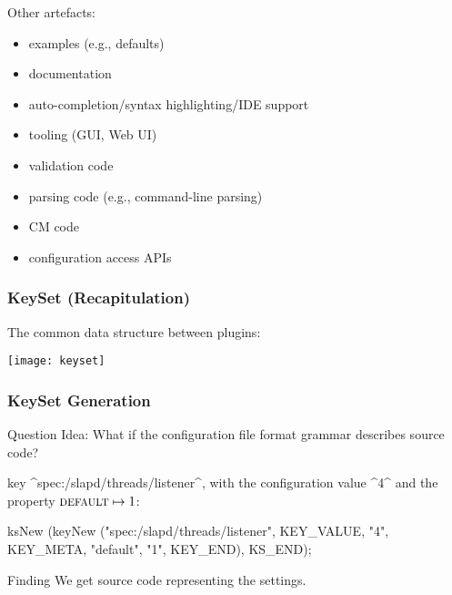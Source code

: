 \begin{frame}
	Other artefacts:

	\pause

	\begin{itemize}
	\item examples (e.g., defaults)
	\item documentation
	\item auto-completion/syntax highlighting/IDE support
	\item tooling (GUI, Web UI)
	\item validation code
	\item parsing code (e.g., command-line parsing)
	\item CM code
	\item configuration access APIs
	\end{itemize}
\end{frame}

\begin{frame}
	\frametitle{KeySet (Recapitulation)}

	The common data structure between plugins:
	\vspace{1cm}

	\texttt{[image: keyset]}
\end{frame}

\begin{frame}[fragile]
	\frametitle{KeySet Generation}
	\begin{alertblock}{Question}
	Idea: What if the configuration file format grammar describes source code?
	\end{alertblock}

	\pause

	key ^spec:/slapd/threads/listener^, with the configuration value ^4^ and the property ${\textsc{default}} \mapsto 1$:

	\begin{code}[gobble=4,language=Cpp]
	ksNew (keyNew ("spec:/slapd/threads/listener",
		       KEY_VALUE, "4",
		       KEY_META, "default", "1",
		       KEY_END),
	       KS_END);
	\end{code}

	\begin{alertblock}{Finding}
	We get source code representing the settings.
	\end{alertblock}
\end{frame}

